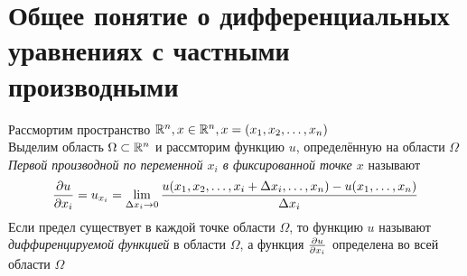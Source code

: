 \documentclass[../main.tex]{subfiles}
\begin{document}
\section{Общее понятие о дифференциальных уравнениях с частными производными}
Рассмортим пространство $\mathbb{R}^n, x\in\mathbb{R}^n, x=(x_1, x_2, \dots, x_n)$\\
Выделим область $\Omega \subset \mathbb{R}^n$ и рассмторим функцию $u$, определённую на области
$\Omega$\\
\textit{Первой производной по переменной $x_i$ в фиксированной точке $x$} называют
\[
    \frac{\partial u}{\partial x_i} = u_{x_i} =
    \lim_{\Delta x_i \to 0}
    \frac{u(x_1, x_2, \dots, x_i+\Delta x_i, \dots, x_n) - u(x_1,\dots, x_n)}
        {\Delta x_i}
\]
Если предел существует в каждой точке области $\Omega$, то функцию $u$ называют \textit{диффиренцируемой функцией}
 в области $\Omega$, а функция $\frac{\partial u}{\partial x_i}$ определена во всей области $\Omega$
\end{document}
